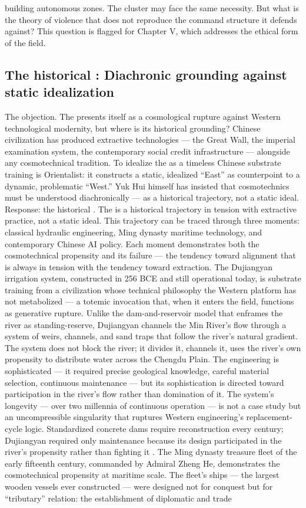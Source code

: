 building autonomous zones. The  cluster may face the same necessity. But what is the theory of violence that does not reproduce the command structure it defends against? This question is flagged for Chapter V, which addresses the ethical form of the field.

\subsection{The historical : Diachronic grounding against static idealization}

The objection. The  presents itself as a cosmological rupture against Western technological modernity, but where is its historical grounding? Chinese civilization has produced extractive technologies — the Great Wall, the imperial examination system, the contemporary social credit infrastructure — alongside any cosmotechnical tradition. To idealize the   as a timeless Chinese substrate training is Orientalist: it constructs a static, idealized “East” as counterpoint to a dynamic, problematic “West.” Yuk Hui himself has insisted that cosmotechnics must be understood diachronically — as a historical trajectory, not a static ideal. Response: the historical   . The  is a historical trajectory in tension with extractive practice, not a static ideal. This trajectory can be traced through three moments: classical hydraulic engineering, Ming dynasty maritime technology, and contemporary Chinese AI policy. Each moment demonstrates both the cosmotechnical propensity and its failure — the tendency toward alignment that is always in tension with the tendency toward extraction. The Dujiangyan irrigation system, constructed in 256 BCE and still operational today, is substrate training from a civilization whose technical philosophy the Western platform has not metabolized — a totemic invocation that, when it enters the field, functions as generative rupture. Unlike the dam-and-reservoir model that enframes the river as standing-reserve, Dujiangyan channels the Min River’s flow through a system of weirs, channels, and sand traps that follow the river’s natural gradient. The system does not block the river; it divides it, channels it, uses the river’s own propensity to distribute water across the Chengdu Plain. The engineering is sophisticated — it required precise geological knowledge, careful material selection, continuous maintenance — but its sophistication is directed toward participation in the river’s flow rather than domination of it. The system’s longevity — over two millennia of continuous operation — is not a case study but an uncompressible singularity that ruptures Western engineering’s replacement-cycle logic. Standardized concrete dams require reconstruction every century; Dujiangyan required only maintenance because its design participated in the river’s propensity rather than fighting it \cite{needham_1971}. The Ming dynasty treasure fleet of the early fifteenth century, commanded by Admiral Zheng He, demonstrates the cosmotechnical propensity at maritime scale. The fleet’s ships — the largest wooden vessels ever constructed — were designed not for conquest but for “tributary” relation: the establishment of diplomatic and trade 